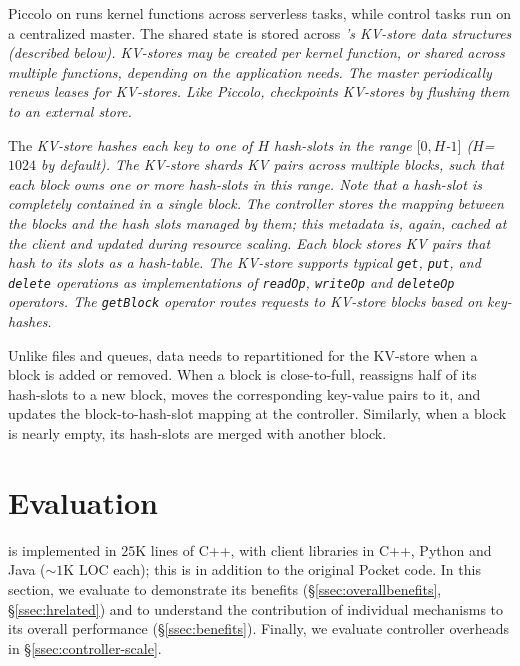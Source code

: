 Piccolo on \jiffy runs kernel functions across serverless tasks, while
control tasks run on a centralized master. The shared
state is stored across \sl's KV-store data 
structures (described below). KV-stores may be created per kernel function, 
or shared across multiple functions, depending on the application needs. 
The master periodically renews 
leases for \sl KV-stores. Like Piccolo,
\sl checkpoints KV-stores by flushing them to an external 
store.

 The \sl KV-store hashes each key to one of $H$ hash-slots in the range $[0,H$-$1]$ ($H$=$1024$ by default). The KV-store shards KV pairs across multiple \jiffy blocks, such that each block owns one or more hash-slots in this range. Note that a hash-slot is completely contained in a single block. The controller stores the mapping between the blocks and the hash slots managed by them; this metadata is, again, cached at the client and updated during resource scaling. Each block stores KV pairs that hash to its slots as a hash-table. The KV-store supports typical \texttt{get}, \texttt{put}, and \texttt{delete} operations as implementations of \texttt{readOp}, \texttt{writeOp} and \texttt{deleteOp} operators. The \texttt{getBlock} operator routes requests to KV-store blocks based on key-hashes. %

Unlike files and queues, data needs to repartitioned for the KV-store when a block is added or removed. When a block is close-to-full, \jiffy reassigns half of its hash-slots to a new block, moves the corresponding key-value pairs to it, and updates the block-to-hash-slot mapping at the controller. Similarly, when a block is nearly empty, its hash-slots are merged with another block. %



\section{Evaluation}
\label{sec:evaluation}
\jiffy is implemented in $25$K lines of C++, with client libraries in C++, Python and Java (${\sim}1$K LOC each); this is in addition to the original Pocket code. In this section, we evaluate \jiffy to demonstrate its benefits (\S\ref{ssec:overallbenefits}, \S\ref{ssec:hrelated}) and to understand the contribution of individual \jiffy mechanisms to its overall performance (\S\ref{ssec:benefits}). Finally, we evaluate \jiffy controller overheads in \S\ref{ssec:controller-scale}.

